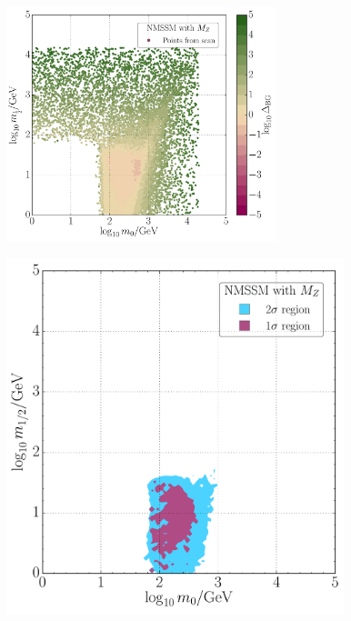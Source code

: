 \documentclass[10pt,aspectratio=169]{beamer}
\begin{document}
\begin{frame}
\begin{columns}[t]
\begin{column}{0.7\textwidth}
\begin{columns}[t]
\begin{column}{0.5\textwidth}
\begin{figure}
          \end{figure}
        \end{column}
        \begin{column}{0.5\textwidth}
          \vspace{-35pt}
          \begin{figure}
            \centering
            \includegraphics[width=0.8\textwidth]{CNMSSM_BG_m0m12}
          \end{figure}
          \vspace{-20pt}
          \begin{figure}
            \centering
            \includegraphics[height=0.7\textwidth]{CNMSSM_pdf_mz_m0m12}
          \end{figure}
        \end{column}
      \end{columns}

\end{column}
\end{columns}
\end{frame}
\end{document}
